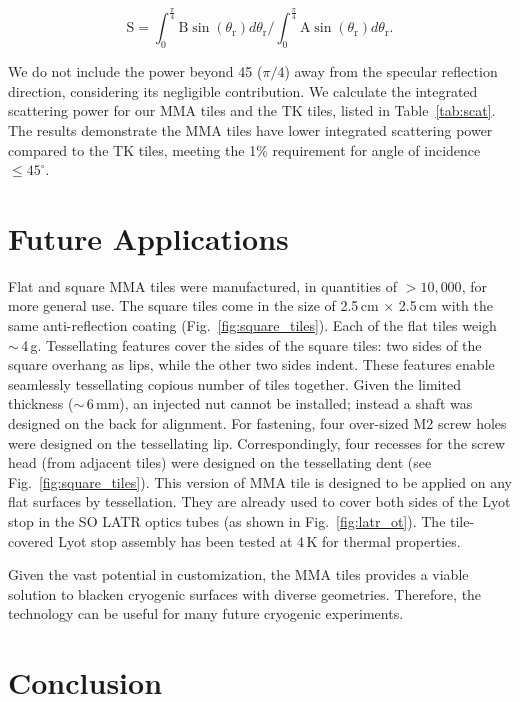 \begin{equation}
\text{S} =\int_{0}^{\frac{\pi}{4}} \text{B} \sin(\theta_\text{r}) d\theta_\text{r} \bigg/ \int_{0}^{\frac{\pi}{4}} \text{A} \sin(\theta_\text{r}) d\theta_\text{r}.
\label{eq:scat}
\end{equation}

We do not include the power beyond 45\dg{} ($\pi/4$) away from the specular reflection direction, considering its negligible contribution. We calculate the integrated scattering power for our MMA tiles and the TK tiles, listed in Table~\ref{tab:scat}. The results demonstrate the MMA tiles have lower integrated scattering power compared to the TK tiles, meeting the 1\% requirement for angle of incidence $\leq 45^{\circ}$.

\section{Future Applications}
\label{sec:future_applications}
Flat and square MMA tiles were manufactured, in quantities of $> 10,000$, for more general use. The square tiles come in the size of 2.5\,cm $\times$ 2.5\,cm with the same anti-reflection coating (Fig.~\ref{fig:square_tiles}). Each of the flat tiles weigh $\sim$\,4\,g. Tessellating features cover the sides of the square tiles: two sides of the square overhang as lips, while the other two sides indent. These features enable seamlessly tessellating copious number of tiles together. Given the limited thickness ($\sim$\,6\,mm), an injected nut cannot be installed; instead a shaft was designed on the back for alignment. For fastening, four over-sized M2 screw holes were designed on the tessellating lip. Correspondingly, four recesses for the screw head (from adjacent tiles) were designed on the tessellating dent (see Fig.~\ref{fig:square_tiles}). This version of MMA tile is designed to be applied on any flat surfaces by tessellation. They are already used to cover both sides of the Lyot stop in the SO LATR optics tubes (as shown in Fig.~\ref{fig:latr_ot}). The tile-covered Lyot stop assembly has been tested at 4\,K for thermal properties. 



Given the vast potential in customization, the MMA tiles provides a viable solution to blacken cryogenic surfaces with diverse geometries. Therefore, the technology can be useful for many future cryogenic experiments.


\section{Conclusion}
\label{sec:conclusion}

